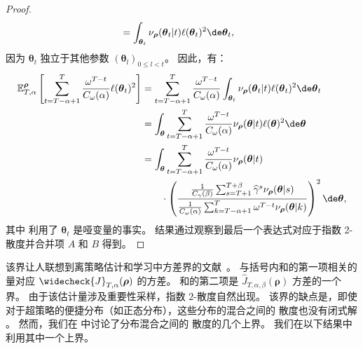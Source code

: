 \begin{proof}
\begin{align*}
   & =  \int_{\boldsymbol\theta_t} \nu_{\boldsymbol\rho}(\boldsymbol\theta_t\vert t) \ell(\boldsymbol\theta_t)^2 \de \boldsymbol\theta_t,
\end{align*}
因为 $\boldsymbol\theta_t$ 独立于其他参数 $(\boldsymbol\theta_l)_{0\le l< t}$。
因此，有：
\begin{align}
    \mathbb{E}^{\boldsymbol\rho}_{T,\alpha} \left[
        \sum_{t=T-\alpha+1}^{T} \frac{\omega^{T-t}}{C_\omega(\alpha)} \ell(\boldsymbol\theta_t)^2
    \right] \nonumber
    &= \sum_{t=T-\alpha+1}^{T} \frac{\omega^{T-t}}{C_\omega(\alpha)}  \int_{\boldsymbol\theta_t} \nu_{\boldsymbol\rho}(\boldsymbol\theta_t\vert t) \ell(\boldsymbol\theta_t)^2 \de \boldsymbol\theta_t \notag
    \\
    &=    \int_{\boldsymbol\theta} \sum_{t=T-\alpha+1}^{T} \frac{\omega^{T-t}}{C_\omega(\alpha)} \nu_{\boldsymbol\rho}(\boldsymbol\theta\vert t) \ell(\boldsymbol\theta)^2 \de \boldsymbol\theta \label{p:0002}
    \\
    &= \int_{\boldsymbol\theta} \sum_{t=T-\alpha+1}^{T} \frac{\omega^{T-t}}{C_\omega(\alpha)} \nu_{\boldsymbol\rho}(\boldsymbol\theta\vert t)
    \\
    &\qquad\cdot\left( \frac{ \frac{1}{C_\gamma(\beta)} \sum_{s=T+1}^{T+\beta} \widehat{\gamma}^s\nu_{\boldsymbol\rho}(\boldsymbol\theta\vert s)}{\frac{1}{C_\omega(\alpha)} \sum_{k=T-\alpha+1}^T \omega^{T-t}\nu_{\boldsymbol\rho}(\boldsymbol\theta \vert k)}\right)^2 \de \boldsymbol\theta,\nonumber
\end{align}
其中  利用了 $\boldsymbol\theta_t$ 是哑变量的事实。
结果通过观察到最后一个表达式对应于指数 2-\Renyi 散度并合并项 $A$ 和 $B$ 得到。
\end{proof}



该界让人联想到离策略估计和学习中方差界的文献~\cite{metelli2018policy, papini2019optimistic, metelli2020importance}。
与括号内和的第一项相关的量对应 $\widecheck{J}_{T,\alpha}({\boldsymbol\rho})$ 的方差。
和的第二项是 $\widehat{J}_{T,\alpha,\beta}({\boldsymbol\rho})$ 方差的一个界。
由于该估计量涉及重要性采样，指数 $2$-\Renyi 散度自然出现。
该界的缺点是，即使对于超策略的便捷分布（如正态分布），这些分布的混合之间的 \Renyi 散度也没有闭式解 \cite{papini2019optimistic}。
然而，我们在  中讨论了分布混合之间的 \Renyi 散度的几个上界。
我们在以下结果中利用其中一个上界。


